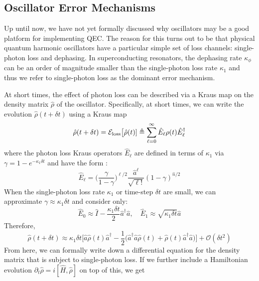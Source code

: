 \subsection{Oscillator Error Mechanisms}

Up until now, we have not yet formally discussed why oscillators may be a good platform for implementing QEC. The reason for this turns out to be that physical quantum harmonic oscillators have a particular simple set of loss channels: single-photon loss and dephasing. In superconducting resonators, the dephasing rate $\kappa_\phi$ can be an order of magnitude smaller than the single-photon loss rate $\kappa_1$ and thus we refer to single-photon loss as the dominant error mechanism. 

At short times, the effect of photon loss can be described via a Kraus map on the density matrix $\hat{\rho}$ of the oscillator. Specifically, at short times, we can write the evolution $\hat{\rho}(t + \delta t)$ using a Kraus map
\begin{equation}
    \hat{\rho}(t + \delta t) = \mathcal{E}_{\rm loss}\big[\hat{\rho}(t)] \triangleq \sum_{\ell = 0}^\infty  \hat{E}_\ell \rho(t)  \hat{E}_\ell^\dagger
\end{equation}
where the photon loss Kraus operators $ \hat{E}_\ell$ are defined in terms of $\kappa_1$ via $\gamma = 1 - e^{-\kappa_1 \delta t}$ and have the form \cite{albert2018performance-and-structure}:
\begin{equation}
    \hat{E}_\ell = \bigg(\frac{\gamma}{1 - \gamma}\bigg)^{\ell/2} \frac{\hat{a}^\ell}{\sqrt{\ell !}} (1 - \gamma)^{\hat{n}/2}
\end{equation}
When the single-photon loss rate $\kappa_1$ or time-step $\delta t$ are small, we can approximate $\gamma \approx \kappa_1 \delta t$ and consider only:
\begin{equation}
    \hat{E}_0 \approx \hat{I} - \frac{\kappa_1 \delta t}{2}\hat{a}^\dagger\hat{a}, \quad \hat{E}_1 \approx \sqrt{\kappa_1 \delta t}\hat{a}
\end{equation}
Therefore, 
\begin{equation}
    \hat{\rho}(t + \delta t) \approx \kappa_1\delta t\bigg[\hat{a}\hat{\rho}(t)\hat{a}^\dagger - \frac{1}{2}\Big(\hat{a}^\dagger\hat{a}\hat{\rho}(t) + \hat{\rho}(t)\hat{a}^\dagger\hat{a}\Big)\bigg] + \mathcal{O}(\delta t^2)
\end{equation}
From here, we can formally write down a differential equation for the density matrix that is subject to single-photon loss. If we further include a Hamiltonian evolution $\partial_t \hat{\rho} = i[\hat{H}, \hat{\rho}]$ on top of this, we get
